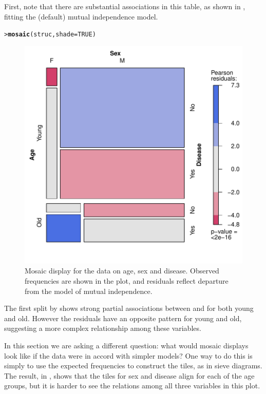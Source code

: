 \documentclass[10pt,krantz2]{krantz}\usepackage[]{graphicx}\usepackage[]{color}
\makeatletter
\newcommand{\hlnum}[1]{\textcolor[rgb]{0.686,0.059,0.569}{#1}}%
\newcommand{\hlstd}[1]{\textcolor[rgb]{0.345,0.345,0.345}{#1}}%
\newcommand{\hlkwc}[1]{\textcolor[rgb]{0.333,0.667,0.333}{#1}}%
\newcommand{\hlkwd}[1]{\textcolor[rgb]{0.737,0.353,0.396}{\textbf{#1}}}%
\newenvironment{kframe}{%
 \def\at@end@of@kframe{}%
 \ifinner\ifhmode%
  \def\at@end@of@kframe{\end{minipage}}%
  \begin{minipage}{\columnwidth}%
 \fi\fi%
 \def\FrameCommand##1{\hskip\@totalleftmargin \hskip-\fboxsep
 \colorbox{shadecolor}{##1}\hskip-\fboxsep
     \hskip-\linewidth \hskip-\@totalleftmargin \hskip\columnwidth}%
 \MakeFramed {\advance\hsize-\width
   \@totalleftmargin\z@ \linewidth\hsize
   \@setminipage}}%
 {\par\unskip\endMakeFramed%
 \at@end@of@kframe}
\newenvironment{knitrout}{}{} %
\renewenvironment{knitrout}{\small\renewcommand{\baselinestretch}{.85}}{} %
\makeatother
\begin{document}
First, note that there are substantial associations in this table, as shown in
, fitting the (default) mutual independence model.
\begin{knitrout}
\color{fgcolor}\begin{kframe}
\begin{alltt}
\hlstd{> }\hlkwd{mosaic}\hlstd{(struc,} \hlkwc{shade} \hlstd{=} \hlnum{TRUE}\hlstd{)}
\end{alltt}
\end{kframe}\begin{figure}[!htbp]

\centerline{\includegraphics[width=.6\textwidth]{ch05/fig/struc-mos1-1} }

\caption[Mosaic display for the data on age, sex and disease]{Mosaic display for the data on age, sex and disease. Observed frequencies are shown in the plot, and residuals reflect departure from the model of mutual independence.}\label{fig:struc-mos1}
\end{figure}


\end{knitrout}
The first split by  shows strong partial
associations between  and  for both young and old.
However the residuals have an opposite pattern for young and old, suggesting
a more complex relationship among these variables.

In this section we are asking a different question: what would mosaic displays look
like if the data were in accord with simpler models?  One way to do this is simply
to use the expected frequencies to construct the tiles, as in sieve diagrams.
The result, in , shows that the tiles for sex and disease
align for each of the age groups, but it is harder to see the relations among all
three variables in this plot.
\end{document}
